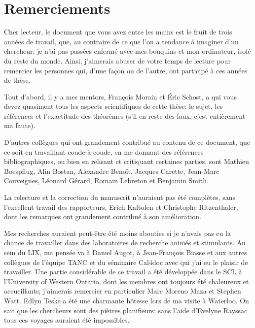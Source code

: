 


\chapter*{Remerciements}

Cher lecteur, le document que vous avez entre les mains est le fruit
de trois années de travail, que, au contraire de ce que l'on a
tendance à imaginer d'un chercheur, je n'ai pas passées enfermé avec
mes bouquins et mon ordinateur, isolé du reste du monde. Ainsi,
j'aimerais abuser de votre temps de lecture pour remercier les
personnes qui, d'une façon ou de l'autre, ont participé à ces années
de thèse.

Tout d'abord, il y a mes mentors, François Morain et Éric Schost, a
qui vous devez quasiment tous les aspects scientifiques de cette
thèse: le sujet, les références et l'exactitude des théorèmes (s'il en
reste des faux, c'est entièrement ma faute).

D'autres collègues qui ont grandement contribué au contenu de ce
document, que ce soit en travaillant coude-à-coude, en me donnant des
références bibliographiques, ou bien en relisant et critiquant
certaines parties, sont Mathieu Boespflug, Alin Bostan, Alexandre
Benoît, Jacques Carette, Jean-Marc Couveignes, Léonard Gérard, Romain
Lebreton et Benjamin Smith.

La relecture et la correction du manuscrit n'auraient pas été
complètes, sans l'excellent travail des rapporteurs, Erich Kaltofen et
Christophe Ritzenthaler, dont les remarques ont grandement contribué à
son amélioration. 

Mes recherches auraient peut-être été moins abouties si je n'avais pas
eu la chance de travailler dans des laboratoires de recherche animés
et stimulants. Au sein du LIX, ma pensée va à Daniel Augot, à
Jean-François Biasse et aux autres collègues de l'équipe TANC et du
séminaire Cal4doc avec qui j'ai eu le plaisir de travailler.  Une
partie considérable de ce travail a été développée dans le SCL à
l'University of Western Ontario, dont les membres ont toujours été
chaleureux et accueillants; j'aimerais remercier en particulier Marc
Moreno Maza et Stephen Watt. Edlyn Teske a été une charmante hôtesse
lors de ma visite à Waterloo.  On sait que les chercheurs sont des
piètres planifieurs: sans l'aide d'Evelyne Rayssac tous ces voyages
auraient été impossibles.

